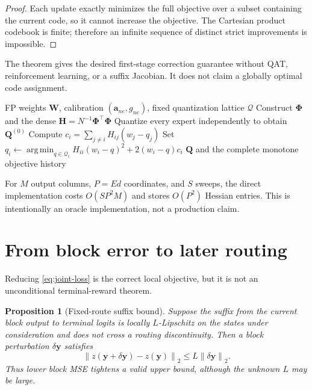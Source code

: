 \documentclass[11pt]{article}
\theoremstyle{plain}
\newtheorem{proposition}{Proposition}
\theoremstyle{definition}
\theoremstyle{remark}
\newcommand{\W}{\bm W}
\newcommand{\Q}{\bm Q}
\newcommand{\Hess}{\bm H}
\newcommand{\PhiM}{\bm\Phi}
\newcommand{\calQ}{\mathcal Q}
\newcommand{\argmin}{\operatorname*{arg\,min}}
\newcommand{\norm}[1]{\left\lVert#1\right\rVert}
\begin{document}
\begin{proof}
Each update exactly minimizes the full objective over a subset containing the current code, so it cannot increase the objective.  The Cartesian product codebook is finite; therefore an infinite sequence of distinct strict improvements is impossible.
\end{proof}

The theorem gives the desired first-stage correction guarantee without QAT, reinforcement learning, or a suffix Jacobian.  It does not claim a globally optimal code assignment.

\begin{algorithm}[t]
\caption{Full-Hessian MoEJointQuant verification solver}\label{alg:joint}
\begin{algorithmic}[1]
\Require FP weights $\W$, calibration $(\bm a_{ne},g_{ne})$, fixed quantization lattice $\calQ$
\State Construct $\PhiM$ and the dense $\Hess=N^{-1}\PhiM^\top\PhiM$
\State Quantize every expert independently to obtain $\Q^{(0)}$
    \State Compute $c_i=\sum_{j\ne i}H_{ij}(w_j-q_j)$
    \State Set $q_i\leftarrow\argmin_{q\in\calQ_i}H_{ii}(w_i-q)^2+2(w_i-q)c_i$
  \EndFor
\EndFor
\State \Return $\Q$ and the complete monotone objective history
\end{algorithmic}
\end{algorithm}

For $M$ output columns, $P=Ed$ coordinates, and $S$ sweeps, the direct implementation costs $O(SP^2M)$ and stores $O(P^2)$ Hessian entries.  This is intentionally an oracle implementation, not a production claim.

\section{From block error to later routing}

Reducing \eqref{eq:joint-loss} is the correct local objective, but it is not an unconditional terminal-reward theorem.

\begin{proposition}[Fixed-route suffix bound]\label{prop:suffix}
Suppose the suffix from the current block output to terminal logits is locally $L$-Lipschitz on the states under consideration and does not cross a routing discontinuity.  Then a block perturbation $\delta\bm y$ satisfies
\begin{equation}
  \norm{z(\bm y+\delta\bm y)-z(\bm y)}_2\le L\norm{\delta\bm y}_2.
\end{equation}
Thus lower block MSE tightens a valid upper bound, although the unknown $L$ may be large.
\end{proposition}
\end{document}
